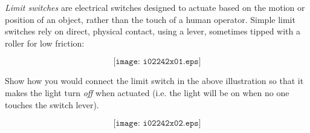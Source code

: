 

{\it Limit switches} are electrical switches designed to actuate based on the motion or position of an object, rather than the touch of a human operator.  Simple limit switches rely on direct, physical contact, using a lever, sometimes tipped with a roller for low friction:

$$\texttt{[image: i02242x01.eps]}$$

\vskip 30pt

Show how you would connect the limit switch in the above illustration so that it makes the light turn {\it off} when actuated (i.e. the light will be on when no one touches the switch lever).







$$\texttt{[image: i02242x02.eps]}$$











